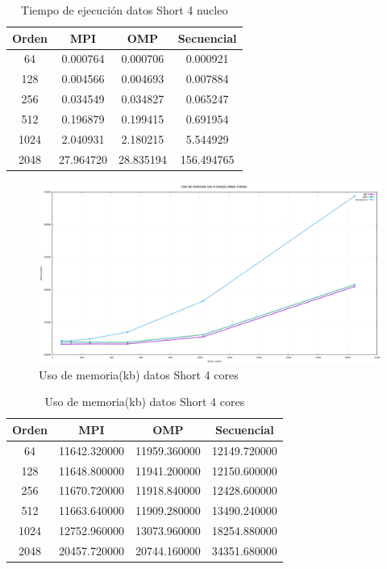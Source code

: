 \documentclass[10pt]{IEEEtran}
\begin{document}
\begin{table}[H]
  \caption{Tiempo de ejecución datos Short 4 nucleo}
  \label{table_example}
  \centering
  \begin{tabular}{|c|c|c|c|}
    \hline
    \textbf{Orden} & \textbf{MPI} & \textbf{OMP} & \textbf{Secuencial} \\
    \hline
    64 & 0.000764 & 0.000706 & 0.000921 \\
    128 & 0.004566 & 0.004693 & 0.007884 \\
    256 & 0.034549 & 0.034827 & 0.065247 \\
    512 & 0.196879 & 0.199415 & 0.691954 \\
    1024 & 2.040931 & 2.180215 & 5.544929 \\
    2048 & 27.964720 & 28.835194 & 156.494765 \\
    \hline
  \end{tabular}
\end{table}

\begin{figure}[H]
  \centering
  \includegraphics[width=0.95\linewidth]{figs/4nucleosCortosMemoria.png}
  \caption{Uso de memoria(kb) datos Short 4 cores}
  \label{fig:c2}
\end{figure}

\begin{table}[H]
  \caption{Uso de memoria(kb) datos Short 4 cores}
  \label{table_example}
  \centering
  \begin{tabular}{|c|c|c|c|}
    \hline
    \textbf{Orden} & \textbf{MPI} & \textbf{OMP} & \textbf{Secuencial} \\
    \hline
    64 & 11642.320000 & 11959.360000 & 12149.720000 \\
    128 & 11648.800000 & 11941.200000 & 12150.600000 \\
    256 & 11670.720000 & 11918.840000 & 12428.600000 \\
    512 & 11663.640000 & 11909.280000 & 13490.240000 \\
    1024 & 12752.960000 & 13073.960000 & 18254.880000 \\
    2048 & 20457.720000 & 20744.160000 & 34351.680000 \\
    \hline
  \end{tabular}
\end{table}
\end{document}
